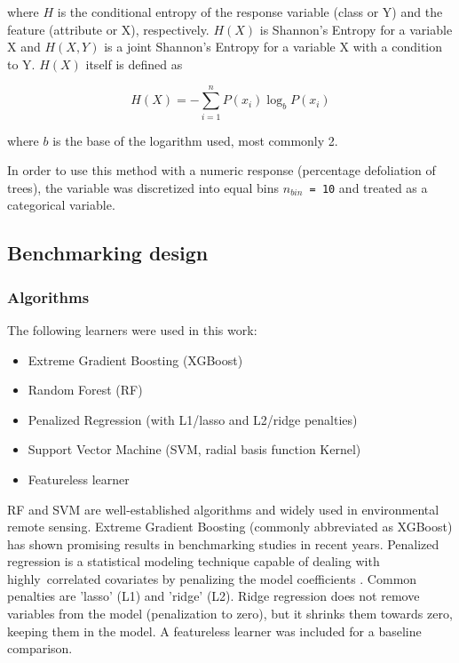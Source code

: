 \documentclass[remotesensing,article,submit,moreauthors,pdftex]{Definitions/mdpi}
\begin{document}
where \(H\) is the conditional entropy of the response variable (class or Y) and the feature (attribute or X), respectively.
$H(X)$ is Shannon's Entropy \cite{shannon1948} for a variable X and $H(X, Y)$ is a joint Shannon's Entropy for a variable X with a condition to Y.
$H(X)$ itself is defined as

\begin{equation}
	H(X) = - \sum_{i=1}^{n} P(x_i)\log_bP(x_i)
\end{equation}

where $b$ is the base of the logarithm used, most commonly 2.

In order to use this method with a numeric response (percentage defoliation of trees), the variable was discretized into equal bins \texttt{\(n_{bin}\) = 10} and treated as a categorical variable.

\subsection{Benchmarking design}

\subsubsection{Algorithms}

The following learners were used in this work:

\begin{itemize}
	\item  Extreme Gradient Boosting (XGBoost)
	\item  Random Forest (RF)
	\item  Penalized Regression (with L1/lasso and L2/ridge penalties)
	\item  Support Vector Machine (SVM, radial basis function Kernel)
	\item  Featureless learner
\end{itemize}

RF and SVM are well-established algorithms and widely used in environmental remote sensing.
Extreme Gradient Boosting (commonly abbreviated as XGBoost) has shown promising results in benchmarking studies in recent years.
Penalized regression is a statistical modeling technique capable of dealing with highly\ correlated covariates by penalizing the model coefficients \cite{hastie2001}.
Common penalties are 'lasso' (L1) and 'ridge' (L2).
Ridge regression does not remove variables from the model (penalization to zero), but it shrinks them towards zero, keeping them in the model.
A featureless learner was included for a baseline comparison.
\end{document}
